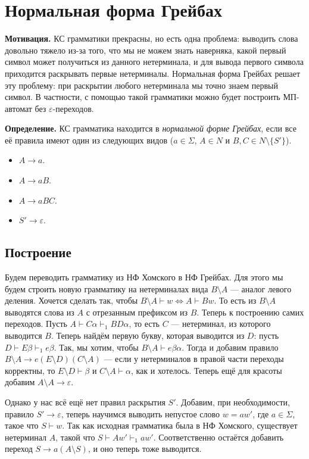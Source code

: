 \section{Нормальная форма Грейбах}
\textbf{Мотивация.} КС грамматики прекрасны, но есть одна проблема: выводить слова довольно тяжело из-за того, что мы не можем знать наверняка, какой первый символ может получиться из данного нетерминала, и для вывода первого символа приходится раскрывать первые нетерминалы.
Нормальная форма Грейбах решает эту проблему: при раскрытии любого нетерминала мы точно знаем первый символ.
В частности, с помощью такой грамматики можно будет построить МП-автомат без $\varepsilon$-переходов.

\textbf{Определение.} КС грамматика находится в \textit{нормальной форме Грейбах}, если все её правила имеют один из следующих видов ($a \in \Sigma$, $A \in N$ и $B, C \in N \setminus \{S'\}$).
\begin{itemize}
    \item $A \to a$.
    \item $A \to aB$.
    \item $A \to aBC$.
    \item $S' \to \varepsilon$.
\end{itemize}

\subsection{Построение}
Будем переводить грамматику из НФ Хомского в НФ Грейбах.
Для этого мы будем строить новую грамматику на нетерминалах вида $B \setminus A$ --- аналог левого деления. 
Хочется сделать так, чтобы $B \setminus A \vdash w \iff A \vdash Bw$.
То есть из $B \setminus A$ выводятся слова из $A$ с отрезанным префиксом из $B$.
Теперь к построению самих переходов.
Пусть $A \vdash C\alpha \vdash_1 BD\alpha$, то есть $C$ --- нетерминал, из которого выводится $B$.
Теперь найдём первую букву, которая выводится из $D$: пусть $D \vdash E\beta \vdash_1 e\beta$.
Так, мы хотим, чтобы $B \setminus A \vdash e \beta \alpha$.
Тогда и добавим правило $B \setminus A \to e(E \setminus D)(C \setminus A)$ --- если у нетерминалов в правой части переходы корректны, то $E \setminus D \vdash \beta$ и $C \setminus A \vdash \alpha$, как и хотелось.
Теперь ещё для красоты добавим $A \setminus A \to \varepsilon$.

Однако у нас всё ещё нет правил раскрытия $S'$.
Добавим, при необходимости, правило $S' \to \varepsilon$, теперь научимся выводить непустое слово $w = aw'$, где $a \in \Sigma$, такое что $S \vdash w$.
Так как исходная грамматика была в НФ Хомского, существует нетерминал $A$, такой что $S \vdash Aw' \vdash_1 aw'$.
Соответственно остаётся добавить переход $S \to a(A \setminus S)$, и оно теперь тоже выводится.

